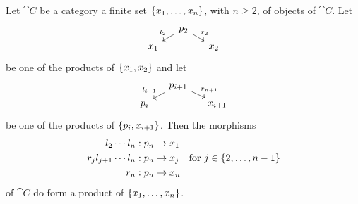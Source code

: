 \begin{proposition}\label{proposition:FiniteProdLeftCons}
  Let \(\cat C\) be a category a finite set
  \(\left\{x_1, \dots{}, x_n\right\}\), with \(n \ge 2\), of objects of
  \(\cat C\). Let
  \[\begin{tikzcd}[row sep=tiny, column sep=small]
      & p_2 \ar["{l_2}", dl, swap] \ar["{r_2}", dr] \\
      x_1 & & x_2 \end{tikzcd}\] be one of the products of
  \(\left\{x_1, x_2\right\}\) and let
  \[\begin{tikzcd}[row sep=tiny, column sep=small]
      & p_{i+1} \ar["{l_{i+1}}", dl, swap] \ar["{r_{n+1}}", dr] \\
      p_i & & x_{i+1}
    \end{tikzcd}\] be one of the products of \(\left\{p_i, x_{i+1}\right\}\).
%
%
  Then the morphisms
  \[\begin{aligned}
    l_2 \cdots{} l_n &: p_n \to x_1 \\
    r_j l_{j+1} \cdots{} l_n &: p_n \to x_j \quad \text{for } j \in \left\{2, \dots{}, n-1\right\} \\
    r_n &: p_n \to x_n
  \end{aligned}\]
of \(\cat C\) do form a product of \(\left\{x_1, \dots{}, x_n\right\}\).
\end{proposition}

